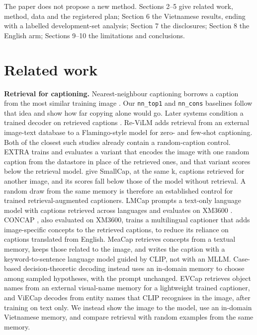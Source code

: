 The paper does not propose a new method. Sections 2--5 give related work, method, data and the
registered plan; Section 6 the Vietnamese results, ending with a labelled development-set analysis;
Section 7 the disclosures; Section 8 the English arm; Sections 9--10 the limitations and
conclusions.

\section{Related work}\label{related-work}

\textbf{Retrieval for captioning.} Nearest-neighbour captioning borrows a caption from the most
similar training image \citep{Devlin2015NN}. Our \texttt{nn\_top1} and \texttt{nn\_cons} baselines
follow that idea and show how far copying alone would go. Later systems condition a trained decoder
on retrieved captions \citep{Ramos2023EXTRA, Ramos2023SmallCap}. Re-ViLM \citep{Yang2023ReViLM} adds
retrieval from an external image-text database to a Flamingo-style model for zero- and few-shot
captioning. Both of the closest such studies already contain a random-caption control. EXTRA
\citep{Ramos2023EXTRA} trains and evaluates a variant that encodes the image with one random caption
from the datastore in place of the retrieved ones, and that variant scores below the retrieval
model. \citet{Li2024RetrievalRobustness} give SmallCap, at the same k, captions retrieved for
another image, and its scores fall below those of the model without retrieval. A random draw from
the same memory is therefore an established control for trained retrieval-augmented captioners.
LMCap prompts a text-only language model with captions retrieved across languages and evaluates on
XM3600 \citep{Ramos2023LMCap}. CONCAP \citep{Ibrahim2025CONCAP}, also evaluated on XM3600, trains a
multilingual captioner that adds image-specific concepts to the retrieved captions, to reduce its
reliance on captions translated from English. MeaCap \citep{Zeng2024MeaCap} retrieves concepts from
a textual memory, keeps those related to the image, and writes the caption with a
keyword-to-sentence language model guided by CLIP, not with an MLLM. Case-based decision-theoretic
decoding \citep{Deguchi2025CBDT} instead uses an in-domain memory to choose among sampled
hypotheses, with the prompt unchanged. EVCap \citep{Li2024EVCap} retrieves object names from an
external visual-name memory for a lightweight trained captioner, and ViECap \citep{Fei2023ViECap}
decodes from entity names that CLIP recognises in the image, after training on text only. We instead
show the image to the model, use an in-domain Vietnamese memory, and compare retrieval with random
examples from the same memory.

